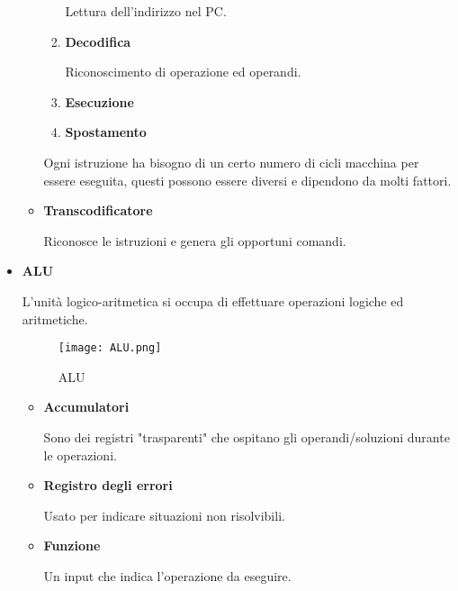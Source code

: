 \documentclass{article}
\begin{document}
\begin{itemize}
\begin{itemize}
\begin{enumerate}
                        Lettura dell'indirizzo nel PC.
                        
                    \item \textbf{Decodifica}

                        Riconoscimento di operazione ed operandi.
                    
                    \item \textbf{Esecuzione}
                    
                    \item \textbf{Spostamento}\newline
                \end{enumerate}

                Ogni istruzione ha bisogno di un certo numero di cicli macchina per essere eseguita, questi possono essere diversi e dipendono da molti fattori.\newline

        \item \textbf{Transcodificatore}

            Riconosce le istruzioni e genera gli opportuni comandi.\newline

        \end{itemize}

    \item \textbf{ALU}

        L'unità logico-aritmetica si occupa di effettuare operazioni logiche 
        ed aritmetiche.

\begin{figure}[ht]
\centering
\texttt{[image: ALU.png]}
\caption{ALU}
\label{fig:alu}
\end{figure}

    \begin{itemize}
        \item \textbf{Accumulatori}

            Sono dei registri "trasparenti" che ospitano gli operandi/soluzioni durante le operazioni.

        \item \textbf{Registro degli errori}

            Usato per indicare situazioni non risolvibili.

        \item \textbf{Funzione}

            Un input che indica l'operazione da eseguire.


\end{itemize}
\end{itemize}
\end{document}
